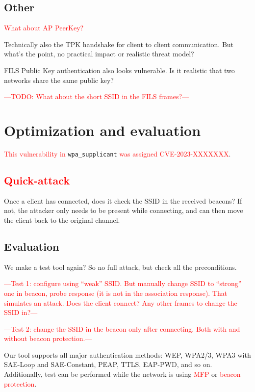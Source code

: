 \documentclass[sigconf,review]{acmart}
\DeclareRobustCommand{\red}[1]{\textcolor{red}{#1}}
\begin{document}
\subsection{Other}

\red{What about AP PeerKey?}

Technically also the TPK handshake for client to client communication.
But what's the point, no practical impact or realistic threat model?

FILS Public Key authentication also looks vulnerable.
Is it realistic that two networks share the same public key?

\red{---TODO: What about the short SSID in the FILS frames?---}

\section{Optimization and evaluation}
\label{sec:evaluation}

\red{This vulnerability in} \verb|wpa_supplicant| \red{was assigned CVE-2023-XXXXXXX}.

\subsection{\red{Quick-attack}}

Once a client has connected, does it check the SSID in the received beacons?
If not, the attacker only needs to be present while connecting, and can then move the client back to the original channel.

\subsection{Evaluation}

We make a test tool again? So no full attack, but check all the preconditions.

\red{---Test 1: configure using ``weak'' SSID. But manually change SSID to ``strong'' one in beacon, probe response (it is not in the association response). That simulates an attack. Does the client connect? Any other frames to change the SSID in?---}

\red{---Test 2: change the SSID in the beacon only after connecting. Both with and without beacon protection.---}

Our tool supports all major authentication methods: WEP, WPA2/3, WPA3 with SAE-Loop and SAE-Constant, PEAP, TTLS, EAP-PWD, and so on.
Additionally, test can be performed while the network is using \red{MFP} or \red{beacon protection}.
\end{document}
